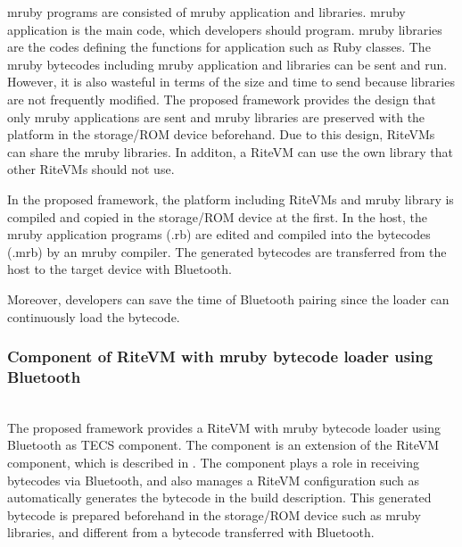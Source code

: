 \documentclass[conference,compsoc]{IEEEtran}
\begin{document}
mruby programs are consisted of mruby application and libraries.
mruby application is the main code, which developers should program.
mruby libraries are the codes defining the functions for application such as Ruby classes. 
The mruby bytecodes including mruby application and libraries can be sent and run.
However, it is also wasteful in terms of the size and time to send because libraries are not frequently modified. 
The proposed framework provides the design that only mruby applications are sent and mruby libraries are preserved with the platform in the storage/ROM device beforehand.
Due to this design, RiteVMs can share the mruby libraries.
In additon, a RiteVM can use the own library that other RiteVMs should not use.

In the proposed framework, the platform including RiteVMs and mruby library is compiled and copied in the storage/ROM device at the first.
In the host, the mruby application programs (.rb) are edited and compiled into the bytecodes (.mrb) by an mruby compiler.
The generated bytecodes are transferred from the host to the target device with Bluetooth.

Moreover, developers can save the time of Bluetooth pairing since the loader can continuously load the bytecode.


\subsubsection{Component of RiteVM with mruby bytecode loader using Bluetooth} \mbox{}\\

The proposed framework provides a RiteVM with mruby bytecode loader using Bluetooth as TECS component.
The component is an extension of the RiteVM component, which is described in \cite{par:mrubyonTECS}.
The component plays a role in receiving bytecodes via Bluetooth, and also manages a RiteVM configuration such as automatically generates the bytecode in the build description.
This generated bytecode is prepared beforehand in the storage/ROM device such as mruby libraries, and different from a bytecode transferred with Bluetooth.
\end{document}
